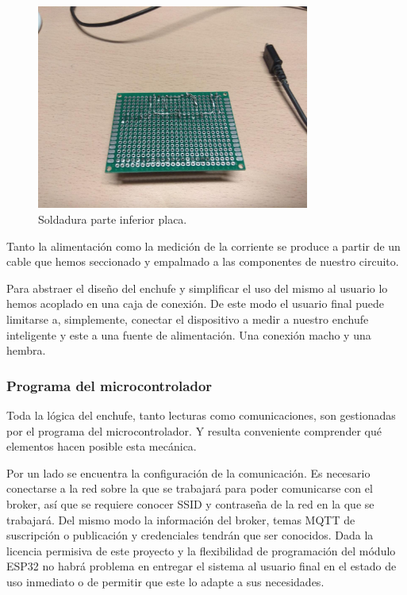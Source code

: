 \documentclass[a4paper,10pt]{article}
\begin{document}
\begin{figure}
  \centering
  \includegraphics[width=0.8\textwidth]{img/soldadura_inferior.jpg}
  \caption{Soldadura parte inferior placa.}\label{fig:soldado_inferior}
\end{figure}

Tanto la alimentación como la medición de la corriente se produce a
partir de un cable que hemos seccionado y empalmado a las componentes
de nuestro circuito.

Para abstraer el diseño del enchufe y simplificar el uso del mismo al
usuario lo hemos acoplado en una caja de conexión. De este modo el
usuario final puede limitarse a, simplemente, conectar el dispositivo
a medir a nuestro enchufe inteligente y este a una fuente de
alimentación. Una conexión macho y una hembra.

\subsubsection{Programa del microcontrolador}

Toda la lógica del enchufe, tanto lecturas como comunicaciones, son
gestionadas por el programa del microcontrolador. Y resulta conveniente
comprender qué elementos hacen posible esta mecánica.

Por un lado se encuentra la configuración de la comunicación. Es
necesario conectarse a la red sobre la que se trabajará para poder
comunicarse con el broker, así que se requiere conocer SSID y
contraseña de la red en la que se trabajará. Del mismo modo la
información del broker, temas MQTT de suscripción o publicación y
credenciales tendrán que ser conocidos. Dada la licencia permisiva de
este proyecto y la flexibilidad de programación del módulo ESP32 no
habrá problema en entregar el sistema al usuario final en el estado de
uso inmediato o de permitir que este lo adapte a sus necesidades.
\end{document}
